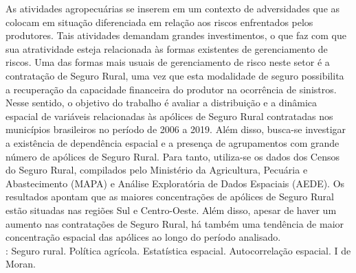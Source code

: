 As atividades agropecuárias se inserem em um contexto de adversidades que as colocam em situação diferenciada em relação aos riscos enfrentados pelos produtores. Tais atividades demandam grandes investimentos, o que faz com que sua atratividade esteja relacionada às formas existentes de gerenciamento de riscos. Uma das formas mais usuais de gerenciamento de risco neste setor é a contratação de Seguro Rural, uma vez que esta modalidade de seguro possibilita a recuperação da capacidade financeira do produtor na ocorrência de sinistros. Nesse sentido, o objetivo do trabalho é avaliar a distribuição e a dinâmica espacial de variáveis relacionadas às apólices de Seguro Rural contratadas nos municípios brasileiros no período de 2006 a 2019. Além disso, busca-se investigar a existência de dependência espacial e a presença de agrupamentos com grande número de apólices de Seguro Rural. Para tanto, utiliza-se os dados dos Censos do Seguro Rural, compilados pelo Ministério da Agricultura, Pecuária e Abastecimento (MAPA) e Análise Exploratória de Dados Espaciais (AEDE). Os resultados apontam que as maiores concentrações de apólices de Seguro Rural estão situadas nas regiões Sul e Centro-Oeste. Além disso, apesar de haver um aumento nas contratações de Seguro Rural, há também uma tendência de maior concentração espacial das apólices ao longo do período analisado. \\
\newline
{}: Seguro rural. Política agrícola. Estatística espacial. Autocorrelação espacial. I de Moran.